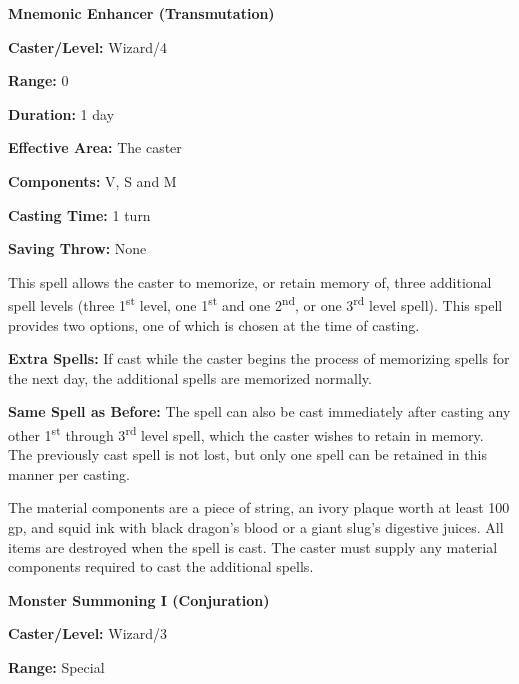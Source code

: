 \begin{multicols}{2}
\vspace{1em}

\noindent
\begin{minipage}{\columnwidth}

\noindent \textbf{Mnemonic Enhancer (Transmutation)}

\noindent \textbf{Caster/Level:} Wizard/4

\noindent \textbf{Range:} 0

\noindent \textbf{Duration:} 1 day

\noindent \textbf{Effective Area:} The caster

\noindent \textbf{Components:} V, S and M

\noindent \textbf{Casting Time:} 1 turn

\noindent \textbf{Saving Throw:} None

\end{minipage}

This spell allows the caster to memorize, or retain memory of, three additional spell levels (three 1\textsuperscript{st} level, one 1\textsuperscript{st} and one 2\textsuperscript{nd}, or one 3\textsuperscript{rd} level spell).  This spell provides two options, one of which is chosen at the time of casting.

\textbf{Extra Spells:} If cast while the caster begins the process of memorizing spells for the next day, the additional spells are memorized normally.  

\textbf{Same Spell as Before:} The spell can also be cast immediately after casting any other 1\textsuperscript{st} through 3\textsuperscript{rd} level spell, which the caster wishes to retain in memory.  The previously cast spell is not lost, but only one spell can be retained in this manner per casting.

The material components are a piece of string, an ivory plaque worth at least 100 gp, and squid ink with black dragon's blood or a giant slug's digestive juices.  All items are destroyed when the spell is cast.  The caster must supply any material components required to cast the additional spells.

\vspace{1em}

\noindent
\begin{minipage}{\columnwidth}

\noindent \textbf{Monster Summoning I (Conjuration)}

\noindent \textbf{Caster/Level:} Wizard/3

\noindent \textbf{Range:} Special


\end{minipage}
\end{multicols}
